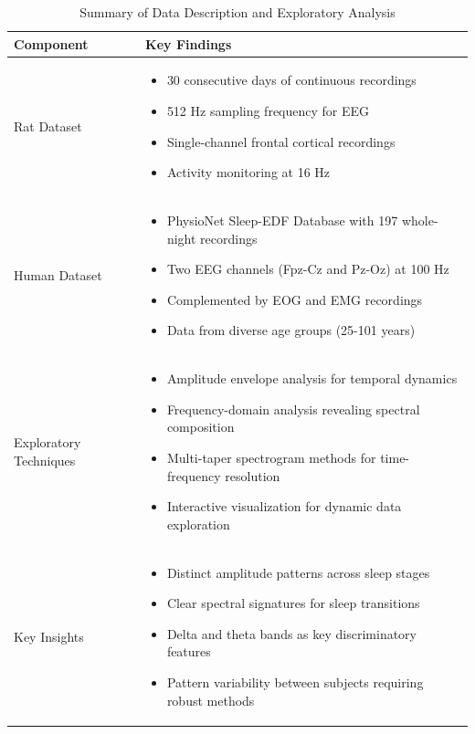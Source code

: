 \documentclass[a4paper,12pt,twoside]{article}
\begin{document}
\begin{table}[H]
\centering
\caption{Summary of Data Description and Exploratory Analysis}
\begin{tabular}{|p{4cm}|p{10cm}|}
\hline
\textbf{Component} & \textbf{Key Findings} \\
\hline
Rat Dataset & 
\begin{itemize}
  \item 30 consecutive days of continuous recordings
  \item 512 Hz sampling frequency for EEG
  \item Single-channel frontal cortical recordings
  \item Activity monitoring at 16 Hz
\end{itemize} \\
\hline
Human Dataset & 
\begin{itemize}
  \item PhysioNet Sleep-EDF Database with 197 whole-night recordings
  \item Two EEG channels (Fpz-Cz and Pz-Oz) at 100 Hz
  \item Complemented by EOG and EMG recordings
  \item Data from diverse age groups (25-101 years)
\end{itemize} \\
\hline
Exploratory Techniques & 
\begin{itemize}
  \item Amplitude envelope analysis for temporal dynamics
  \item Frequency-domain analysis revealing spectral composition
  \item Multi-taper spectrogram methods for time-frequency resolution
  \item Interactive visualization for dynamic data exploration
\end{itemize} \\
\hline
Key Insights & 
\begin{itemize}
  \item Distinct amplitude patterns across sleep stages
  \item Clear spectral signatures for sleep transitions
  \item Delta and theta bands as key discriminatory features
  \item Pattern variability between subjects requiring robust methods
\end{itemize} \\
\hline
\end{tabular}
\label{tab:data_description_summary}
\end{table}
\end{document}
